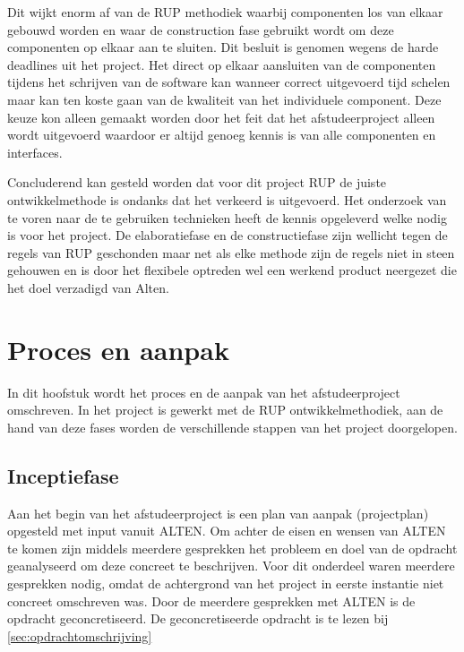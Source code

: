 \documentclass[a4paper, 11pt, oneside]{report}
\begin{document}
Dit wijkt enorm af van de RUP methodiek waarbij componenten los van elkaar gebouwd worden en waar de construction fase gebruikt wordt om deze componenten op elkaar aan te sluiten. Dit besluit is genomen wegens de harde deadlines uit het project. Het direct op elkaar aansluiten van de componenten tijdens het schrijven van de software kan wanneer correct uitgevoerd tijd schelen maar kan ten koste gaan van de kwaliteit van het individuele component. Deze keuze kon alleen gemaakt worden door het feit dat het afstudeerproject alleen wordt uitgevoerd waardoor er altijd genoeg kennis is van alle componenten en interfaces.

Concluderend kan gesteld worden dat voor dit project RUP de juiste ontwikkelmethode is ondanks dat het verkeerd is uitgevoerd. 
Het onderzoek van te voren naar de te gebruiken technieken heeft de kennis opgeleverd welke nodig is voor het project. De elaboratiefase en de constructiefase zijn wellicht tegen de regels van RUP geschonden maar net als elke methode zijn de regels niet in steen gehouwen en is door het flexibele optreden wel een werkend product neergezet die het doel verzadigd van Alten.
 

\chapter{Proces en aanpak}\label{sec:proces-en-aanpak}
In dit hoofstuk wordt het proces en de aanpak van het afstudeerproject omschreven.
In het project is gewerkt met de RUP ontwikkelmethodiek, aan de hand van deze fases worden de verschillende stappen van het project doorgelopen.

\section{Inceptiefase}\label{sec:inceptiefase}

Aan het begin van het afstudeerproject is een plan van aanpak (projectplan) opgesteld met input vanuit ALTEN.
Om achter de eisen en wensen van ALTEN te komen zijn middels meerdere gesprekken het probleem en doel van de opdracht geanalyseerd om deze concreet te beschrijven.
Voor dit onderdeel waren meerdere gesprekken nodig, omdat de achtergrond van het project in eerste instantie niet concreet omschreven was.
Door de meerdere gesprekken met ALTEN is de opdracht geconcretiseerd. De geconcretiseerde opdracht is te lezen bij \autoref{sec:opdrachtomschrijving} 
\end{document}
